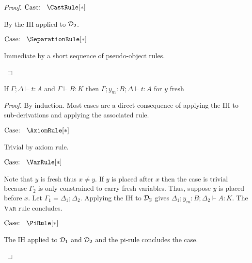 \begin{proof}
    $\text{Case: }\begin{array}{c} \CastRule[*] \end{array}$
    \begin{proofcase}
        By the IH applied to $\mathcal{D}_{2}$.
    \end{proofcase}

    $\text{Case: }\begin{array}{c} \SeparationRule[*] \end{array}$
    \begin{proofcase}
        Immediate by a short sequence of pseudo-object rules.
    \end{proofcase}
\end{proof}

\begin{lemma}[Weakening]
    \label{lem:2:weakening}
    If $\Gamma; \Delta \vdash t : A$ and $\Gamma \vdash B : K$ then $\Gamma; y_m : B; \Delta \vdash t : A$ for $y$ fresh
\end{lemma}
\begin{proof}
    By induction.
    Most cases are a direct consequence of applying the IH to sub-derivations and applying the associated rule.

    $\text{Case: }\begin{array}{c} \AxiomRule[*] \end{array}$
    \begin{proofcase}
        Trivial by axiom rule.
    \end{proofcase}

    $\text{Case: }\begin{array}{c} \VarRule[*] \end{array}$
    \begin{proofcase}
        Note that $y$ is fresh thus $x \neq y$.
        If $y$ is placed after $x$ then the case is trivial because $\Gamma_2$ is only constrained to carry fresh variables.
        Thus, suppose $y$ is placed before $x$.
        Let $\Gamma_1 = \Delta_1; \Delta_2$.
        Applying the IH to $\mathcal{D}_{2}$ gives $\Delta_1; y_m : B; \Delta_2 \vdash A : K$.
        The \textsc{Var} rule concludes.
    \end{proofcase}

    $\text{Case: }\begin{array}{c} \PiRule[*] \end{array}$
    \begin{proofcase}
        The IH applied to $\mathcal{D}_{1}$ and $\mathcal{D}_{2}$ and the pi-rule concludes the case.
    \end{proofcase}
\end{proof}

